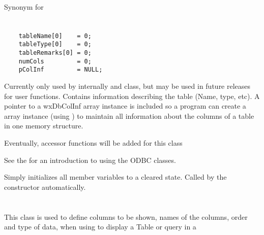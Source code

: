 

\label{wxdbtableminusminus}


Synonym for 



\section{}\label{wxdbtableinf}

\begin{verbatim}
    tableName[0]    = 0;
    tableType[0]    = 0;
    tableRemarks[0] = 0;
    numCols         = 0;
    pColInf         = NULL;
\end{verbatim}

Currently only used by  internally
and  class, but may be used in future releases for
user functions.  Contains information describing the table (Name, type, etc).
A pointer to a wxDbColInf array instance is included so a program can create a
 array instance (using
)
to maintain all information about the columns of a table in one memory
structure.

Eventually, accessor functions will be added for this class

See the  for
an introduction to using the ODBC classes.

\label{wxdbtableinfinitialize}

Simply initializes all member variables to a cleared state.  Called by
the constructor automatically.

\section{}\label{wxdbgridcolinfo}

This class is used  to define columns to be shown, names of the columns,
order and type of data, when using  to display
a Table or query in a 

